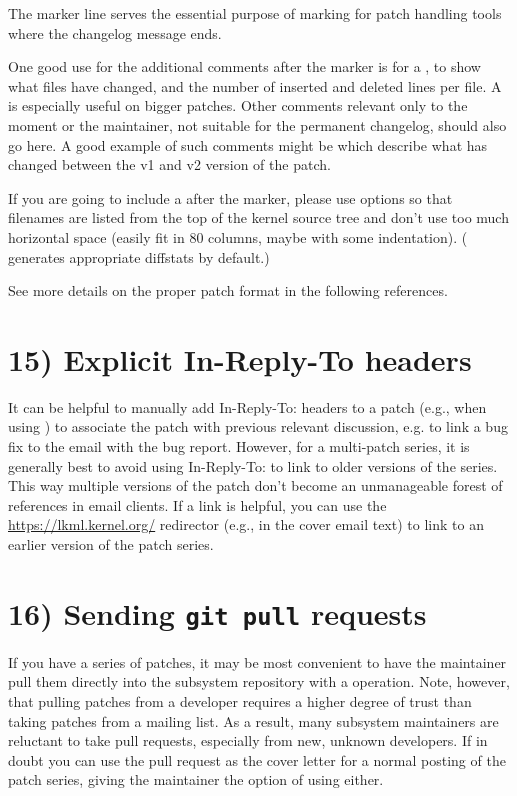 \documentclass[a4paper,8pt,english]{sphinxmanual}
\begin{document}
The \code{-{-}-} marker line serves the essential purpose of marking for patch
handling tools where the changelog message ends.

One good use for the additional comments after the \code{-{-}-} marker is for
a , to show what files have changed, and the number of
inserted and deleted lines per file.  A  is especially useful
on bigger patches.  Other comments relevant only to the moment or the
maintainer, not suitable for the permanent changelog, should also go
here.  A good example of such comments might be 
which describe what has changed between the v1 and v2 version of the
patch.

If you are going to include a  after the \code{-{-}-} marker, please
use  options  so that filenames are listed from
the top of the kernel source tree and don't use too much horizontal
space (easily fit in 80 columns, maybe with some indentation).  (
generates appropriate diffstats by default.)

See more details on the proper patch format in the following
references.


\section{15) Explicit In-Reply-To headers}
\label{process/submitting-patches:explicit-in-reply-to-headers}\label{process/submitting-patches:explicit-in-reply-to}
It can be helpful to manually add In-Reply-To: headers to a patch
(e.g., when using ) to associate the patch with
previous relevant discussion, e.g. to link a bug fix to the email with
the bug report.  However, for a multi-patch series, it is generally
best to avoid using In-Reply-To: to link to older versions of the
series.  This way multiple versions of the patch don't become an
unmanageable forest of references in email clients.  If a link is
helpful, you can use the \href{https://lkml.kernel.org/}{https://lkml.kernel.org/} redirector (e.g., in
the cover email text) to link to an earlier version of the patch series.


\section{16) Sending \texttt{git pull} requests}
\label{process/submitting-patches:sending-git-pull-requests}
If you have a series of patches, it may be most convenient to have the
maintainer pull them directly into the subsystem repository with a
 operation.  Note, however, that pulling patches from a developer
requires a higher degree of trust than taking patches from a mailing list.
As a result, many subsystem maintainers are reluctant to take pull
requests, especially from new, unknown developers.  If in doubt you can use
the pull request as the cover letter for a normal posting of the patch
series, giving the maintainer the option of using either.
\end{document}
